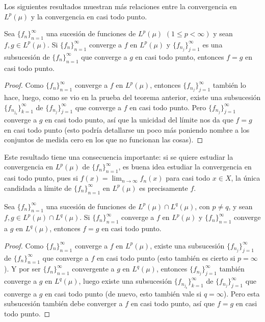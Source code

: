 \documentclass[a4paper, 11pt, oneside]{report}
\begin{document}
Los siguientes resultados muestran más relaciones entre la convergencia en $L^p(\mu)$ y la convergencia en casi todo punto.

\begin{proposition}\label{pro:1.8.9}
  Sea $\{f_n\}_{n=1}^\infty$ una sucesión de funciones de $L^p(\mu)$ $(1 \leq p < \infty)$ y sean $f,g \in L^p(\mu)$. Si $\{f_n\}_{n=1}^\infty$ converge a $f$ en $L^p(\mu)$ y $\{f_{n_j}\}_{j=1}^\infty$ es una subsucesión de $\{f_n\}_{n=1}^\infty$ que converge a $g$ en casi todo punto, entonces $f = g$ en casi todo punto.
\end{proposition}

\begin{proof}
  Como $\{f_n\}_{n=1}^\infty$ converge a $f$ en $L^p(\mu)$, entonces $\{f_{n_j}\}_{j=1}^\infty$ también lo hace, luego, como se vio en la prueba del teorema anterior, existe una subsucesión $\{f_{n_{j_k}}\}_{k=1}^\infty$ de $\{f_{n_j}\}_{j=1}^\infty$ que converge a $f$ en casi todo punto. Pero $\{f_{n_j}\}_{j=1}^\infty$ converge a $g$ en casi todo punto, así que la unicidad del límite nos da que $f=g$ en casi todo punto (esto podría detallarse un poco más poniendo nombre a los conjuntos de medida cero en los que no funcionan las cosas).
\end{proof}

Este resultado tiene una consecuencia importante: si se quiere estudiar la convergencia en $L^p(\mu)$ de $\{f_n\}_{n=1}^\infty$, es buena idea estudiar la convergencia en casi todo punto, pues si $f(x)=\lim_{n \to \infty}f_n(x)$ para casi todo $x \in X$, la única candidada a límite de $\{f_n\}_{n=1}^\infty$ en $L^p(\mu)$ es precisamente $f$.

\begin{proposition}\label{pro:1.8.10}
  Sea $\{f_n\}_{n=1}^\infty$ una sucesión de funciones de $L^p(\mu) \cap L^q(\mu)$, con $p \neq q$, y sean $f,g \in L^p(\mu)\cap L^q(\mu)$. Si $\{f_n\}_{n=1}^\infty$ converge a $f$ en $L^p(\mu)$ y $\{f_n\}_{n=1}^\infty$ converge a $g$ en $L^q(\mu)$, entonces $f = g$ en casi todo punto.
\end{proposition}

\begin{proof}
  Como $\{f_n\}_{n=1}^\infty$ converge a $f$ en $L^p(\mu)$, existe una subsucesión $\{f_{n_j}\}_{j=1}^\infty$ de $\{f_n\}_{n=1}^\infty$ que converge a $f$ en casi todo punto (esto también es cierto si $p = \infty$). Y por ser $\{f_n\}_{n=1}^\infty$ convergente a $g$ en $L^q(\mu)$, entonces $\{f_{n_j}\}_{j=1}^\infty$ también converge a $g$ en $L^q(\mu)$, luego existe una subsucesión $\{f_{n_{j_k}}\}_{k=1}^\infty$ de $\{f_{n_j}\}_{j=1}^\infty$ que converge a $g$ en casi todo punto (de nuevo, esto también vale si $q = \infty$). Pero esta subsucesión también debe converger a $f$ en casi todo punto, así que $f=g$ en casi todo punto.
\end{proof}
\end{document}

